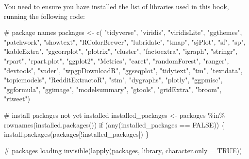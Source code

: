 \documentclass[
  letterpaper,
  DIV=11,
  numbers=noendperiod]{scrreprt}
\newenvironment{Shaded}{\begin{snugshade}}{\end{snugshade}}
\newcommand{\AttributeTok}[1]{\textcolor[rgb]{0.40,0.45,0.13}{#1}}
\newcommand{\CommentTok}[1]{\textcolor[rgb]{0.37,0.37,0.37}{#1}}
\newcommand{\ConstantTok}[1]{\textcolor[rgb]{0.56,0.35,0.01}{#1}}
\newcommand{\ControlFlowTok}[1]{\textcolor[rgb]{0.00,0.23,0.31}{#1}}
\newcommand{\FunctionTok}[1]{\textcolor[rgb]{0.28,0.35,0.67}{#1}}
\newcommand{\NormalTok}[1]{\textcolor[rgb]{0.00,0.23,0.31}{#1}}
\newcommand{\OtherTok}[1]{\textcolor[rgb]{0.00,0.23,0.31}{#1}}
\newcommand{\SpecialCharTok}[1]{\textcolor[rgb]{0.37,0.37,0.37}{#1}}
\newcommand{\StringTok}[1]{\textcolor[rgb]{0.13,0.47,0.30}{#1}}
\begin{document}
You need to ensure you have installed the list of libraries used in this
book, running the following code:

\begin{Shaded}
\begin{Highlighting}[]
\CommentTok{\# package names}
\NormalTok{packages }\OtherTok{\textless{}{-}} \FunctionTok{c}\NormalTok{( }\StringTok{"tidyverse"}\NormalTok{, }\StringTok{"viridis"}\NormalTok{, }\StringTok{"viridisLite"}\NormalTok{, }\StringTok{"ggthemes"}\NormalTok{, }\StringTok{"patchwork"}\NormalTok{, }\StringTok{"showtext"}\NormalTok{, }\StringTok{"RColorBrewer"}\NormalTok{, }\StringTok{"lubridate"}\NormalTok{, }\StringTok{"tmap"}\NormalTok{, }\StringTok{"sjPlot"}\NormalTok{, }\StringTok{"sf"}\NormalTok{, }\StringTok{"sp"}\NormalTok{, }\StringTok{"kableExtra"}\NormalTok{, }\StringTok{"ggcorrplot"}\NormalTok{, }\StringTok{"plotrix"}\NormalTok{, }\StringTok{"cluster"}\NormalTok{, }\StringTok{"factoextra"}\NormalTok{, }\StringTok{"igraph"}\NormalTok{, }\StringTok{"stringr"}\NormalTok{, }\StringTok{"rpart"}\NormalTok{, }\StringTok{"rpart.plot"}\NormalTok{, }\StringTok{"ggplot2"}\NormalTok{, }\StringTok{"Metrics"}\NormalTok{, }\StringTok{"caret"}\NormalTok{, }\StringTok{"randomForest"}\NormalTok{, }\StringTok{"ranger"}\NormalTok{, }\StringTok{"devtools"}\NormalTok{, }\StringTok{"vader"}\NormalTok{, }\StringTok{"wpgpDownloadR"}\NormalTok{, }\StringTok{"ggseqplot"}\NormalTok{, }\StringTok{"tidytext"}\NormalTok{, }\StringTok{"tm"}\NormalTok{, }\StringTok{"textdata"}\NormalTok{, }\StringTok{"topicmodels"}\NormalTok{, }\StringTok{"RedditExtractoR"}\NormalTok{, }\StringTok{"stm"}\NormalTok{, }\StringTok{"dygraphs"}\NormalTok{, }\StringTok{"plotly"}\NormalTok{, }\StringTok{"ggpmisc"}\NormalTok{, }\StringTok{"ggformula"}\NormalTok{, }\StringTok{"ggimage"}\NormalTok{, }\StringTok{"modelsummary"}\NormalTok{, }\StringTok{"gtools"}\NormalTok{, }\StringTok{"gridExtra"}\NormalTok{, }\StringTok{"broom"}\NormalTok{, }\StringTok{"rtweet"}\NormalTok{)}

\CommentTok{\# install packages not yet installed}
\NormalTok{installed\_packages }\OtherTok{\textless{}{-}}\NormalTok{ packages }\SpecialCharTok{\%in\%} \FunctionTok{rownames}\NormalTok{(}\FunctionTok{installed.packages}\NormalTok{())}
\ControlFlowTok{if}\NormalTok{ (}\FunctionTok{any}\NormalTok{(installed\_packages }\SpecialCharTok{==} \ConstantTok{FALSE}\NormalTok{)) \{}
  \FunctionTok{install.packages}\NormalTok{(packages[}\SpecialCharTok{!}\NormalTok{installed\_packages])}
\NormalTok{\}}

\CommentTok{\# packages loading}
\FunctionTok{invisible}\NormalTok{(}\FunctionTok{lapply}\NormalTok{(packages, library, }\AttributeTok{character.only =} \ConstantTok{TRUE}\NormalTok{))}
\end{Highlighting}
\end{Shaded}
\end{document}
